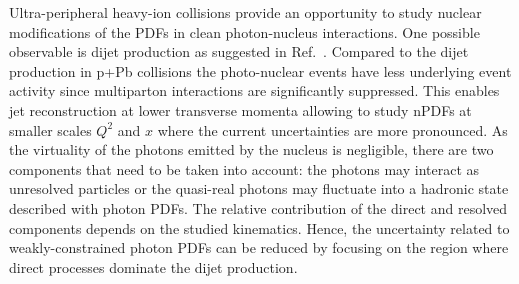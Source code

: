 \documentclass[../report.tex]{subfiles}
\begin{document}
Ultra-peripheral heavy-ion collisions provide an opportunity to study nuclear modifications of the PDFs in clean photon-nucleus interactions. One possible observable is dijet production as suggested in Ref.~\cite{Strikman:2005yv}. Compared to the dijet production in p+Pb collisions the photo-nuclear events have less underlying event activity since multiparton interactions are significantly suppressed. This enables jet reconstruction at lower transverse momenta allowing to study nPDFs at smaller scales $Q^2$ and $x$ where the current uncertainties are more pronounced. As the virtuality of the photons emitted by the nucleus is negligible, there are two components that need to be taken into account: the photons may interact as unresolved particles or the quasi-real photons may fluctuate into a hadronic state described with photon PDFs. The relative contribution of the direct and resolved components depends on the studied kinematics. Hence, the uncertainty related to weakly-constrained photon PDFs can be reduced by focusing on the region where direct processes dominate the dijet production.
\end{document}
